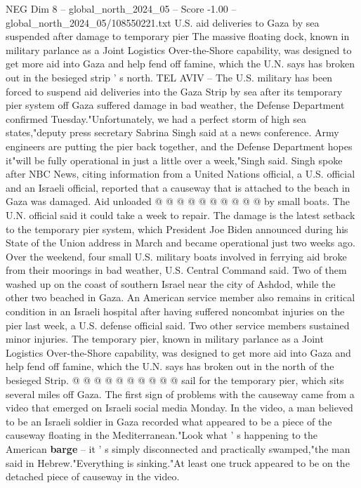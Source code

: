 \begin{textsample}{NEG Dim 8 – global\_north\_2024\_05 – Score -1.00 – global\_north\_2024\_05/108550221.txt}  \label{ex:f8_neg_273}
U.S. aid deliveries to Gaza by sea suspended after damage to temporary pier The massive floating dock, known in military parlance as a Joint Logistics Over-the-Shore capability, was designed to get more aid into Gaza and help fend off famine, which the U.N. says has broken out in the besieged strip ' s north.
TEL AVIV -- The U.S. military has been forced to suspend aid deliveries into the Gaza Strip by sea after its temporary pier system off Gaza suffered damage in bad weather, the Defense Department confirmed Tuesday."Unfortunately, we had a perfect storm of high sea states,"deputy press secretary Sabrina Singh said at a news conference.
Army engineers are putting the pier back together, and the Defense Department hopes it"will be fully operational in just a little over a week,"Singh said.
Singh spoke after NBC News, citing information from a United Nations official, a U.S. official and an Israeli official, reported that a causeway that is attached to the beach in Gaza was damaged.
Aid unloaded @ @ @ @ @ @ @ @ @ @ by small boats.
The U.N. official said it could take a week to repair.
The damage is the latest setback to the temporary pier system, which President Joe Biden announced during his State of the Union address in March and became operational just two weeks ago.
Over the weekend, four small U.S. military boats involved in ferrying aid broke from their moorings in bad weather, U.S.
Central Command said.
Two of them washed up on the coast of southern Israel near the city of Ashdod, while the other two beached in Gaza.
An American service member also remains in critical condition in an Israeli hospital after having suffered noncombat injuries on the pier last week, a U.S. defense official said.
Two other service members sustained minor injuries.
The temporary pier, known in military parlance as a Joint Logistics Over-the-Shore capability, was designed to get more aid into Gaza and help fend off famine, which the U.N. says has broken out in the north of the besieged Strip. @ @ @ @ @ @ @ @ @ @ sail for the temporary pier, which sits several miles off Gaza.
The first sign of problems with the causeway came from a video that emerged on Israeli social media Monday.
In the video, a man believed to be an Israeli soldier in Gaza recorded what appeared to be a piece of the causeway floating in the Mediterranean."Look what ' s happening to the American \textbf{barge} -- it ' s simply disconnected and practically swamped,"the man said in Hebrew."Everything is sinking."At least one truck appeared to be on the detached piece of causeway in the video.

\end{textsample}
